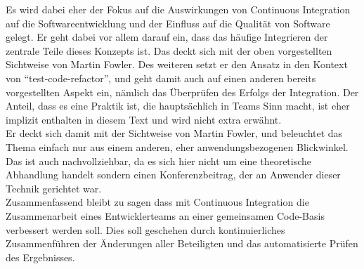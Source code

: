 Es wird dabei eher der Fokus auf die Auswirkungen von Continuous Integration auf die Softwareentwicklung und der Einfluss auf die Qualität von Software gelegt. Er geht dabei vor allem darauf ein, dass das häufige Integrieren der zentrale Teile dieses Konzepts ist. Das deckt sich mit der oben vorgestellten Sichtweise von Martin Fowler. Des weiteren setzt er den Ansatz in den Kontext von "`test-code-refactor"', und geht damit auch auf einen anderen bereits vorgestellten Aspekt ein, nämlich das Überprüfen des Erfolgs der Integration. Der Anteil, dass es eine Praktik ist, die hauptsächlich in Teams Sinn macht, ist eher implizit enthalten in diesem Text und wird nicht extra erwähnt.\\
Er deckt sich damit mit der Sichtweise von Martin Fowler, und beleuchtet das Thema einfach nur aus einem anderen, eher anwendungsbezogenen Blickwinkel. Das ist auch nachvollziehbar, da es sich hier nicht um eine theoretische Abhandlung handelt sondern einen Konferenzbeitrag, der an Anwender dieser Technik gerichtet war.\\

Zusammenfassend bleibt zu sagen dass mit Continuous Integration die Zusammenarbeit eines Entwicklerteams an einer gemeinsamen Code-Basis verbessert werden soll. Dies soll geschehen durch kontinuierliches Zusammenführen der Änderungen aller Beteiligten und das automatisierte Prüfen des Ergebnisses.
